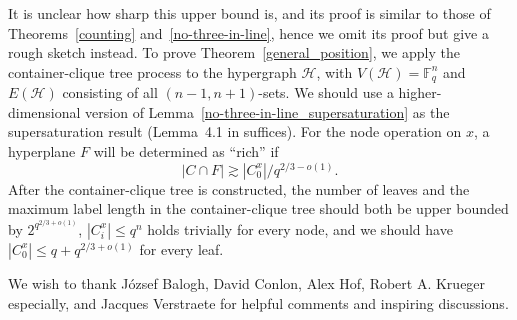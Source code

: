 \documentclass[11pt]{article}
\theoremstyle{definition}
\begin{document}
It is unclear how sharp this upper bound is, and its proof is similar to those of Theorems~\ref{counting} and~\ref{no-three-in-line}, hence we omit its proof but give a rough sketch instead. To prove Theorem~\ref{general_position}, we apply the container-clique tree process to the hypergraph $\mathcal{H}$, with $V(\mathcal{H}) = \mathbb{F}^n_q$ and $E(\mathcal{H})$ consisting of all $(n-1,n+1)$-sets. We should use a higher-dimensional version of Lemma~\ref{no-three-in-line_supersaturation} as the supersaturation result (Lemma~4.1 in \cite{chen2023random} suffices). For the node operation on $x$, a hyperplane $F$ will be determined as ``rich'' if \begin{equation*}
    |C\cap F| \gtrsim |C^x_0|/q^{2/3 - o(1)}.
\end{equation*} After the container-clique tree is constructed, the number of leaves and the maximum label length in the container-clique tree should both be upper bounded by $2^{q^{2/3+o(1)}}$, $|C^x_i| \leq q^n$ holds trivially for every node, and we should have $|C^x_0| \leq q+q^{2/3+o(1)}$ for every leaf.


\medskip {} %
We wish to thank József Balogh, David Conlon, Alex Hof, Robert A. Krueger especially, and Jacques Verstraete for helpful comments and inspiring discussions.


{\footnotesize}
\end{document}
